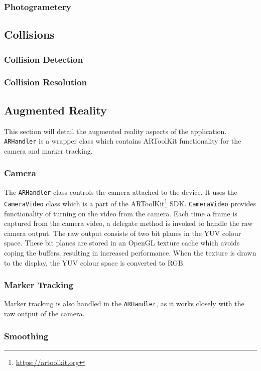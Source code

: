 \documentclass{cmppgr}
\begin{document}
\subsubsection{Photogrametery}


\subsection{Collisions}
\subsubsection{Collision Detection}
\subsubsection{Collision Resolution}

\subsection{Augmented Reality}
This section will detail the augmented reality aspects of the application. \texttt{ARHandler} is a wrapper class which contains ARToolKit functionality for the camera and marker tracking. 
 
\subsubsection{Camera}
The \texttt{ARHandler} class controls the camera attached to the device. It uses the \texttt{CameraVideo} class which is a part of the ARToolKit\footnote{\url{https://artoolkit.org}} SDK. \texttt{CameraVideo} provides functionality of turning on the video from the camera. Each time a frame is captured from the camera video, a delegate method is invoked to handle the raw camera output. The raw output consists of two bit planes in the YUV colour space. These bit planes are stored in an OpenGL texture cache which avoids coping the buffers, resulting in increased performance. When the texture is drawn to the display, the YUV colour space is converted to RGB. 

\subsubsection{Marker Tracking}
Marker tracking is also handled in the \texttt{ARHandler}, as it works closely with the raw output of the camera. 

\subsubsection{Smoothing}
\end{document}
